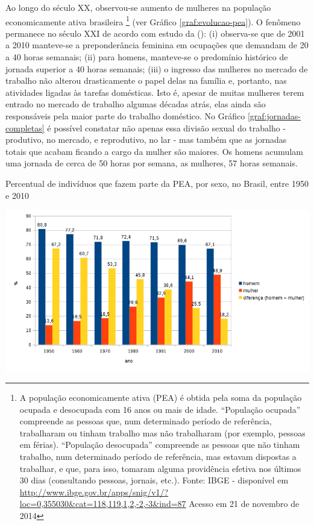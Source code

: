 Ao longo do século XX, observou-se aumento de mulheres na população economicamente ativa brasileira%
\footnote{A população economicamente ativa (PEA) é obtida pela soma da população ocupada e desocupada com 16 anos ou mais de idade. ``População ocupada'' compreende as pessoas que, num determinado período de referência, trabalharam ou tinham trabalho mas não trabalharam (por exemplo, pessoas em férias). ``População desocupada'' compreende as pessoas que não tinham trabalho, num determinado período de referência, mas estavam dispostas a trabalhar, e que, para isso, tomaram alguma providência efetiva nos últimos 30 dias (consultando pessoas, jornais, etc.). Fonte: IBGE - disponível em \url{http://www.ibge.gov.br/apps/snig/v1/?loc=0,355030&cat=118,119,1,2,-2,-3&ind=87} Acesso em 21 de novembro de 2014} 
(ver Gráfico \ref{graf:evolucao-pea}). 
O fenômeno permanece no século XXI de acordo com estudo da  (\citeyear{ABRAMO2010}):
(i) observa-se que de 2001 a 2010 manteve-se a preponderância feminina em ocupações que demandam de 20 a 40 horas semanais;
(ii) para homens, manteve-se o predomínio histórico de jornada superior a 40 horas semanais;
(iii) o ingresso das mulheres no mercado de trabalho não alterou drasticamente o papel delas na família e, portanto, nas atividades ligadas às tarefas domésticas. Isto é, apesar de muitas mulheres terem entrado no mercado de trabalho algumas décadas atrás, elas ainda são responsáveis pela maior parte do trabalho doméstico. No Gráfico \ref{graf:jornadas-completas} é possível constatar não apenas essa divisão sexual do trabalho - produtivo, no mercado, e reprodutivo, no lar - mas também que as jornadas totais que acabam ficando a cargo da mulher são maiores. Os homens acumulam uma jornada de cerca de 50 horas por semana, as mulheres, 57 horas semanais.

\begin{grafico}[htb]%
    \caption{\label{graf:evolucao-pea}Percentual de indivíduos que fazem parte da PEA, por sexo, no Brasil, entre 1950 e 2010}%
    \begin{center}%
        \includegraphics[width=1.05\textwidth]{./imagens/evolucao-pea1.png}%
    \end{center}%
\end{grafico}%

